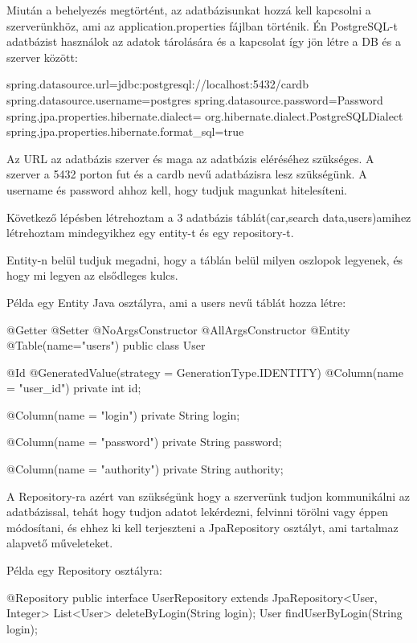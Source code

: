 Miután a behelyezés megtörtént, az adatbázisunkat hozzá kell kapcsolni a szerverünkhöz, ami az application.properties fájlban történik. Én PostgreSQL-t adatbázist használok az adatok tárolására és a kapcsolat így jön létre a DB és a szerver között:

\begin{java}
spring.datasource.url=jdbc:postgresql://localhost:5432/cardb
spring.datasource.username=postgres
spring.datasource.password=Password
spring.jpa.properties.hibernate.dialect=
  org.hibernate.dialect.PostgreSQLDialect
spring.jpa.properties.hibernate.format_sql=true
\end{java}

Az URL az adatbázis szerver és maga az adatbázis eléréséhez szükséges. A szerver a 5432 porton fut és a cardb nevű adatbázisra lesz szükségünk.
A username és password ahhoz kell, hogy tudjuk magunkat hitelesíteni.

Következő lépésben létrehoztam a 3 adatbázis táblát(car,search data,users)amihez létrehoztam mindegyikhez egy entity-t és egy repository-t.

Entity-n belül tudjuk megadni, hogy a táblán belül milyen oszlopok legyenek, és hogy mi legyen az elsődleges kulcs.

Példa egy Entity Java osztályra, ami a users nevű táblát hozza létre:

\begin{java}
@Getter
@Setter
@NoArgsConstructor
@AllArgsConstructor
@Entity
@Table(name="users")
public class User {
    @Id
    @GeneratedValue(strategy = GenerationType.IDENTITY)
    @Column(name = "user_id")
    private int id;

    @Column(name = "login")
    private String login;

    @Column(name = "password")
    private String password;

    @Column(name = "authority")
    private String authority;
}
\end{java}

A Repository-ra azért van szükségünk hogy a szerverünk tudjon kommunikálni az adatbázissal, tehát hogy tudjon adatot lekérdezni, felvinni törölni vagy éppen módosítani, és ehhez ki kell terjeszteni a JpaRepository osztályt, ami tartalmaz alapvető műveleteket.

Példa egy Repository osztályra:

\begin{java}
@Repository
public interface UserRepository
extends JpaRepository<User, Integer> {
    List<User> deleteByLogin(String login);
    User findUserByLogin(String login);
}
\end{java}
\newpage

